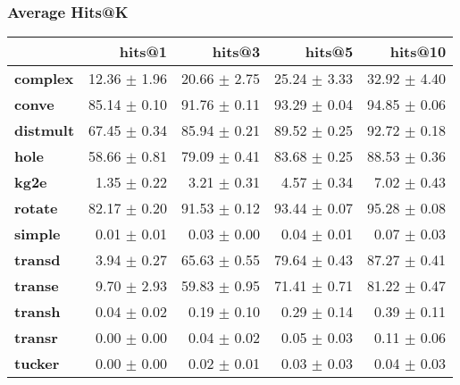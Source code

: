 \documentclass{article}
\begin{document}
    \subsubsection{Average Hits@K}
    \begin{center}
    \begin{tabular}{lrrrr}
\toprule
{} &        hits@1 &        hits@3 &        hits@5 &       hits@10 \\
\midrule
\textbf{complex } &  12.36 $\pm$ 1.96 &  20.66 $\pm$ 2.75 &  25.24 $\pm$ 3.33 &  32.92 $\pm$ 4.40 \\
\textbf{conve   } &  85.14 $\pm$ 0.10 &  91.76 $\pm$ 0.11 &  93.29 $\pm$ 0.04 &  94.85 $\pm$ 0.06 \\
\textbf{distmult} &  67.45 $\pm$ 0.34 &  85.94 $\pm$ 0.21 &  89.52 $\pm$ 0.25 &  92.72 $\pm$ 0.18 \\
\textbf{hole    } &  58.66 $\pm$ 0.81 &  79.09 $\pm$ 0.41 &  83.68 $\pm$ 0.25 &  88.53 $\pm$ 0.36 \\
\textbf{kg2e    } &   1.35 $\pm$ 0.22 &   3.21 $\pm$ 0.31 &   4.57 $\pm$ 0.34 &   7.02 $\pm$ 0.43 \\
\textbf{rotate  } &  82.17 $\pm$ 0.20 &  91.53 $\pm$ 0.12 &  93.44 $\pm$ 0.07 &  95.28 $\pm$ 0.08 \\
\textbf{simple  } &   0.01 $\pm$ 0.01 &   0.03 $\pm$ 0.00 &   0.04 $\pm$ 0.01 &   0.07 $\pm$ 0.03 \\
\textbf{transd  } &   3.94 $\pm$ 0.27 &  65.63 $\pm$ 0.55 &  79.64 $\pm$ 0.43 &  87.27 $\pm$ 0.41 \\
\textbf{transe  } &   9.70 $\pm$ 2.93 &  59.83 $\pm$ 0.95 &  71.41 $\pm$ 0.71 &  81.22 $\pm$ 0.47 \\
\textbf{transh  } &   0.04 $\pm$ 0.02 &   0.19 $\pm$ 0.10 &   0.29 $\pm$ 0.14 &   0.39 $\pm$ 0.11 \\
\textbf{transr  } &   0.00 $\pm$ 0.00 &   0.04 $\pm$ 0.02 &   0.05 $\pm$ 0.03 &   0.11 $\pm$ 0.06 \\
\textbf{tucker  } &   0.00 $\pm$ 0.00 &   0.02 $\pm$ 0.01 &   0.03 $\pm$ 0.03 &   0.04 $\pm$ 0.03 \\
\bottomrule
\end{tabular}

    \end{center}
\end{document}
